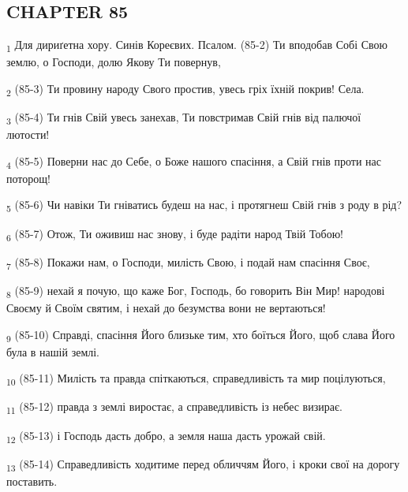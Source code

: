 \subsection{CHAPTER 85}
\begin{tcolorbox}
\textsubscript{1} Для дириґетна хору. Синів Кореєвих. Псалом. (85-2) Ти вподобав Собі Свою землю, о Господи, долю Якову Ти повернув,
\end{tcolorbox}
\begin{tcolorbox}
\textsubscript{2} (85-3) Ти провину народу Свого простив, увесь гріх їхній покрив! Села.
\end{tcolorbox}
\begin{tcolorbox}
\textsubscript{3} (85-4) Ти гнів Свій увесь занехав, Ти повстримав Свій гнів від палючої лютости!
\end{tcolorbox}
\begin{tcolorbox}
\textsubscript{4} (85-5) Поверни нас до Себе, о Боже нашого спасіння, а Свій гнів проти нас поторощ!
\end{tcolorbox}
\begin{tcolorbox}
\textsubscript{5} (85-6) Чи навіки Ти гніватись будеш на нас, і протягнеш Свій гнів з роду в рід?
\end{tcolorbox}
\begin{tcolorbox}
\textsubscript{6} (85-7) Отож, Ти оживиш нас знову, і буде радіти народ Твій Тобою!
\end{tcolorbox}
\begin{tcolorbox}
\textsubscript{7} (85-8) Покажи нам, о Господи, милість Свою, і подай нам спасіння Своє,
\end{tcolorbox}
\begin{tcolorbox}
\textsubscript{8} (85-9) нехай я почую, що каже Бог, Господь, бо говорить Він Мир! народові Своєму й Своїм святим, і нехай до безумства вони не вертаються!
\end{tcolorbox}
\begin{tcolorbox}
\textsubscript{9} (85-10) Справді, спасіння Його близьке тим, хто боїться Його, щоб слава Його була в нашій землі.
\end{tcolorbox}
\begin{tcolorbox}
\textsubscript{10} (85-11) Милість та правда спіткаються, справедливість та мир поцілуються,
\end{tcolorbox}
\begin{tcolorbox}
\textsubscript{11} (85-12) правда з землі виростає, а справедливість із небес визирає.
\end{tcolorbox}
\begin{tcolorbox}
\textsubscript{12} (85-13) і Господь дасть добро, а земля наша дасть урожай свій.
\end{tcolorbox}
\begin{tcolorbox}
\textsubscript{13} (85-14) Справедливість ходитиме перед обличчям Його, і кроки свої на дорогу поставить.
\end{tcolorbox}
